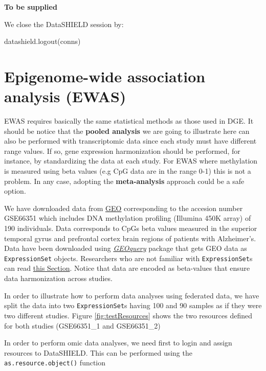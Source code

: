 \documentclass[
]{book}
\newenvironment{Shaded}{\begin{snugshade}}{\end{snugshade}}
\newcommand{\FunctionTok}[1]{\textcolor[rgb]{0.00,0.00,0.00}{#1}}
\newcommand{\NormalTok}[1]{#1}
\begin{document}
\textbf{To be supplied}

We close the DataSHIELD session by:

\begin{Shaded}
\begin{Highlighting}[]
\FunctionTok{datashield.logout}\NormalTok{(conns)}
\end{Highlighting}
\end{Shaded}

\hypertarget{epigenome-wide-association-analysis-ewas}{%
\chapter{Epigenome-wide association analysis (EWAS)}\label{epigenome-wide-association-analysis-ewas}}

EWAS requires basically the same statistical methods as those used in DGE. It should be notice that the \textbf{pooled analysis} we are going to illustrate here can also be performed with transcriptomic data since each study must have different range values. If so, gene expression harmonization should be performed, for instance, by standardizing the data at each study. For EWAS where methylation is measured using beta values (e.g CpG data are in the range 0-1) this is not a problem. In any case, adopting the \textbf{meta-analysis} approach could be a safe option.

We have downloaded data from \href{https://www.ncbi.nlm.nih.gov/geo/}{GEO} corresponding to the accesion number GSE66351 which includes DNA methylation profiling (Illumina 450K array) of 190 individuals. Data corresponds to CpGs beta values measured in the superior temporal gyrus and prefrontal cortex brain regions of patients with Alzheimer's. Data have been downloaded using \emph{\href{https://bioconductor.org/packages/3.12/GEOquery}{GEOquery}} package that gets GEO data as \texttt{ExpressionSet} objects. Researchers who are not familiar with \texttt{ExpressionSet}s can read \protect\hyperlink{BioC}{this Section}. Notice that data are encoded as beta-values that ensure data harmonization across studies.

In order to illustrate how to perform data analyses using federated data, we have split the data into two \texttt{ExpressionSet}s having 100 and 90 samples as if they were two different studies. Figure \ref{fig:testResources} shows the two resources defined for both studies (GSE66351\_1 and GSE66351\_2)

In order to perform omic data analyses, we need first to login and assign resources to DataSHIELD. This can be performed using the \texttt{as.resource.object()} function
\end{document}
